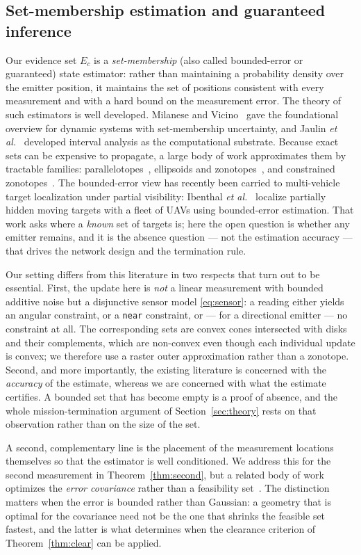 \documentclass[journal,10pt]{IEEEtran}
\theoremstyle{definition}
\begin{document}
\subsection{Set-membership estimation and guaranteed inference}
\label{sec:relset}
Our evidence set $E_c$ is a \emph{set-membership} (also called bounded-error or guaranteed)
state estimator: rather than maintaining a probability density over the emitter position, it
maintains the set of positions consistent with every measurement and with a hard bound on the
measurement error. The theory of such estimators is well developed. Milanese and
Vicino~\cite{milanese1991} gave the foundational overview for dynamic systems with set-membership
uncertainty, and Jaulin \emph{et al.}~\cite{jaulin2001} developed interval analysis as the
computational substrate. Because exact sets can be expensive to propagate, a large body of work
approximates them by tractable families: parallelotopes~\cite{chisci1996}, ellipsoids and
zonotopes~\cite{alamo2005,combastel2003}, and constrained zonotopes~\cite{scott2016}. The
bounded-error view has recently been carried to multi-vehicle target localization under
partial visibility: Ibenthal \emph{et al.}~\cite{ibenthal2023} localize partially hidden
moving targets with a fleet of UAVs using bounded-error estimation. That work asks where a
\emph{known} set of targets is; here the open question is whether any emitter remains, and it
is the absence question --- not the estimation accuracy --- that drives the network design and
the termination rule.

Our setting differs from this literature in two respects that turn out to be essential. First,
the update here is \emph{not} a linear measurement with bounded additive noise but a disjunctive
sensor model \eqref{eq:sensor}: a reading either yields an angular constraint, or a
\texttt{near} constraint, or --- for a directional emitter --- no constraint at all. The
corresponding sets are convex cones intersected with disks and their complements, which are
non-convex even though each individual update is convex; we therefore use a raster outer
approximation rather than a zonotope. Second, and more importantly, the existing literature is
concerned with the \emph{accuracy} of the estimate, whereas we are concerned with what the
estimate certifies. A bounded set that has become empty is a proof of absence, and the whole
mission-termination argument of Section~\ref{sec:theory} rests on that observation rather than on
the size of the set.

A second, complementary line is the placement of the measurement locations themselves so that the
estimator is well conditioned. We address this for the second measurement in
Theorem~\ref{thm:second}, but a related body of work optimizes the \emph{error covariance} rather
than a feasibility set~\cite{bishop2010,martinez2006}. The distinction matters when the error is
bounded rather than Gaussian: a geometry that is optimal for the covariance need not be the one
that shrinks the feasible set fastest, and the latter is what determines when the clearance
criterion of Theorem~\ref{thm:clear} can be applied.
\end{document}
